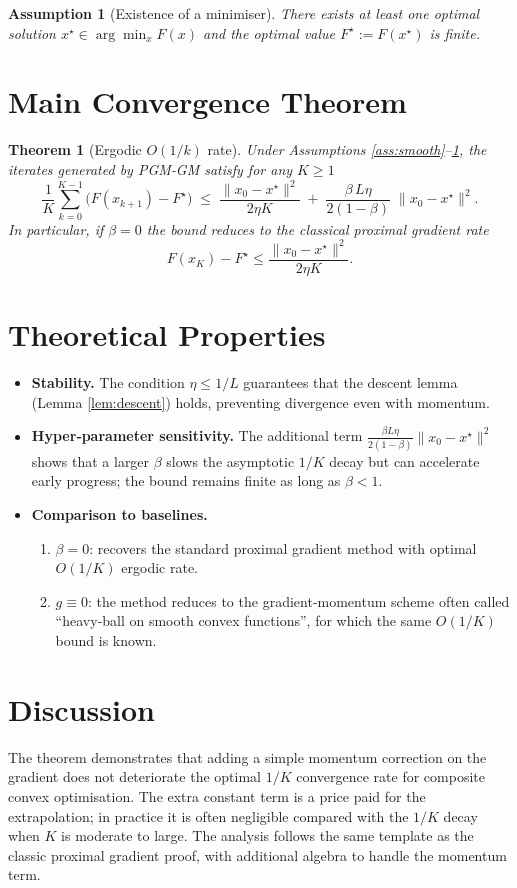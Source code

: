 \documentclass[11pt]{article}
\newtheorem{theorem}{Theorem}
\newtheorem{assumption}{Assumption}
\begin{document}
\begin{assumption}[Existence of a minimiser]\label{ass:opt}
There exists at least one optimal solution $x^\star\in\arg\min_{x}F(x)$ and the optimal value $F^\star:=F(x^\star)$ is finite.
\end{assumption}

\section*{Main Convergence Theorem}
\begin{theorem}[Ergodic $O(1/k)$ rate]\label{thm:rate}
Under Assumptions \ref{ass:smooth}–\ref{ass:opt}, the iterates generated by PGM‑GM satisfy for any $K\ge 1$
\[
\frac1K\sum_{k=0}^{K-1}\bigl(F(x_{k+1})-F^\star\bigr)
\;\le\;
\frac{\|x_0-x^\star\|^{2}}{2\eta K}
\;+\;
\frac{\beta\,L\eta}{2(1-\beta)}\;\|x_0-x^\star\|^{2}.
\]
In particular, if $\beta=0$ the bound reduces to the classical proximal gradient rate
\[
F(x_{K})-F^\star\le \frac{\|x_0-x^\star\|^{2}}{2\eta K}.
\]
\end{theorem}

\section*{Theoretical Properties}
\begin{itemize}
  \item \textbf{Stability.} The condition $\eta\le 1/L$ guarantees that the descent lemma (Lemma \ref{lem:descent}) holds, preventing divergence even with momentum.
  \item \textbf{Hyper‑parameter sensitivity.} The additional term $\frac{\beta L\eta}{2(1-\beta)}\|x_0-x^\star\|^{2}$ shows that a larger $\beta$ slows the asymptotic $1/K$ decay but can accelerate early progress; the bound remains finite as long as $\beta<1$.
  \item \textbf{Comparison to baselines.}
    \begin{enumerate}
      \item $\beta=0$: recovers the standard proximal gradient method with optimal $O(1/K)$ ergodic rate.
      \item $g\equiv0$: the method reduces to the gradient‑momentum scheme often called ``heavy‑ball on smooth convex functions'', for which the same $O(1/K)$ bound is known.
    \end{enumerate}
\end{itemize}

\section*{Discussion}
The theorem demonstrates that adding a simple momentum correction on the gradient does not deteriorate the optimal $1/K$ convergence rate for composite convex optimisation. The extra constant term is a price paid for the extrapolation; in practice it is often negligible compared with the $1/K$ decay when $K$ is moderate to large. The analysis follows the same template as the classic proximal gradient proof, with additional algebra to handle the momentum term.
\end{document}
